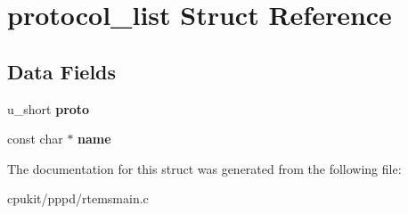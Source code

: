 \hypertarget{structprotocol__list}{}\section{protocol\+\_\+list Struct Reference}
\label{structprotocol__list}
\subsection*{Data Fields}
\begin{DoxyCompactItemize}
\item 
\mbox{\label{structprotocol__list_a264be4ea663c3bc3f2950fc1e49e31f4}} 
u\+\_\+short {\bfseries proto}
\item 
\mbox{\label{structprotocol__list_a9c5d9cba5aa6323e2f809979a3ef94a4}} 
const char $\ast$ {\bfseries name}
\end{DoxyCompactItemize}


The documentation for this struct was generated from the following file\+:\begin{DoxyCompactItemize}
\item 
cpukit/pppd/rtemsmain.\+c\end{DoxyCompactItemize}

